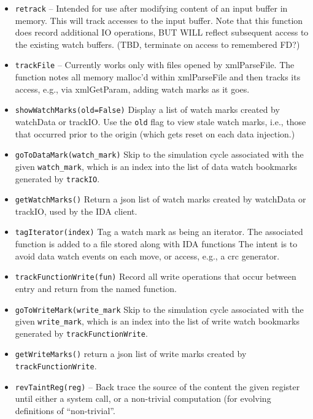 \documentclass[titlepage]{article}
\begin{document}
\begin{itemize}
\item {\tt retrack} -- Intended for use after modifying content of an input buffer in memory.  This will track accesses to the input buffer.
Note that this function does record additional IO operations, BUT WILL reflect subsequent access to the existing watch buffers.  (TBD, terminate on access
to remembered FD?)

\item {\tt trackFile} -- Currently works only with files opened by xmlParseFile. The function notes all memory malloc'd within
xmlParseFile and then tracks its access, e.g., via xmlGetParam, adding watch marks as it goes.

\item {\tt showWatchMarks(old=False)} Display a list of watch marks created by watchData or trackIO.  Use the {\tt old} flag to view stale watch marks, i.e., 
those that occurred prior to the origin (which gets reset on each data injection.)

\item {\tt goToDataMark(watch\_mark)}  Skip to the simulation cycle associated with the given {\tt watch\_mark}, which is an index into the list of
data watch bookmarks generated by {\tt trackIO}.

\item {\tt getWatchMarks()} Return a json list of watch marks created by watchData or trackIO, used by the IDA client.

\item {\tt tagIterator(index)} Tag a watch mark as being an iterator.  The associated function is added to a file stored along with IDA functions
The intent is to avoid data watch events on each move, or access, e.g., a crc generator.

\item {\tt trackFunctionWrite(fun)} Record all write operations that occur between entry and return from the named function.

\item {\tt goToWriteMark(write\_mark} Skip to the simulation cycle associated with the given {\tt write\_mark}, which is an index into the list of 
write watch bookmarks generated by {\tt trackFunctionWrite}.

\item {\tt getWriteMarks()} return a json list of write marks created by {\tt trackFunctionWrite}.

\item {\tt revTaintReg(reg)} – Back trace the source of the content the given register until either a system call, or a non-trivial computation (for evolving definitions of “non-trivial”.  


\end{itemize}
\end{document}
